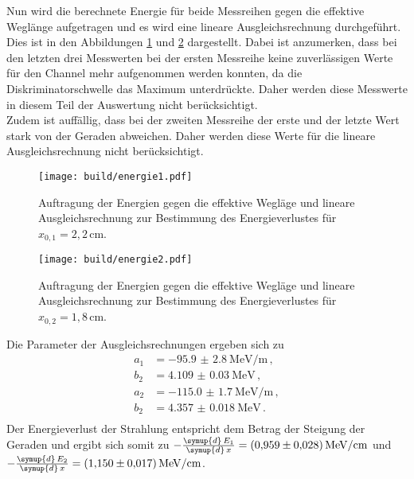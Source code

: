 Nun wird die berechnete Energie für beide Messreihen gegen die effektive Weglänge aufgetragen
und es wird eine lineare Ausgleichsrechnung durchgeführt. Dies ist in den Abbildungen
\ref{fig:energie1} und \ref{fig:energie2} dargestellt. Dabei ist anzumerken, dass bei
den letzten drei Messwerten bei der ersten Messreihe keine zuverlässigen Werte für den
Channel mehr aufgenommen werden konnten, da die Diskriminatorschwelle das Maximum
unterdrückte. Daher werden diese Messwerte in diesem Teil der Auswertung nicht berücksichtigt.\\
Zudem ist auffällig, dass bei der zweiten Messreihe der erste und der letzte Wert stark von
der Geraden abweichen. Daher werden diese Werte für die lineare Ausgleichsrechnung nicht berücksichtigt.

\begin{figure}[H]
  \centering
  \texttt{[image: build/energie1.pdf]}
  \caption{Auftragung der Energien gegen die effektive Wegläge und lineare Ausgleichsrechnung
  zur Bestimmung des Energieverlustes für $x_{0,1}=2{,}2\,$cm.}
  \label{fig:energie1}
\end{figure}

\begin{figure}[H]
  \centering
  \texttt{[image: build/energie2.pdf]}
  \caption{Auftragung der Energien gegen die effektive Wegläge und lineare Ausgleichsrechnung
  zur Bestimmung des Energieverlustes für $x_{0,2}=1{,}8\,$cm.}
  \label{fig:energie2}
\end{figure}

Die Parameter der Ausgleichsrechnungen ergeben sich zu
\begin{align*}
  a_1 &= \SI{-95.9(28)}{\MeV\per\meter} \,,\\
  b_2 &= \SI{4.109(0030)}{\MeV} \,,\\
  a_2 &= \SI{-115.0(17)}{\MeV\per\meter} \,,\\
  b_2 &= \SI{4.357(0018)}{\MeV} \,.\\
\end{align*}
Der Energieverlust der Strahlung entspricht dem Betrag der Steigung der Geraden und ergibt sich
somit zu $-\frac{\symup{d}\,E_1}{\symup{d}\,x}=\SI{0.959(028)}{\MeV\per\centi\meter}$ und
$-\frac{\symup{d}\,E_2}{\symup{d}\,x}=\SI{1.150(017)}{\MeV\per\centi\meter}$.



